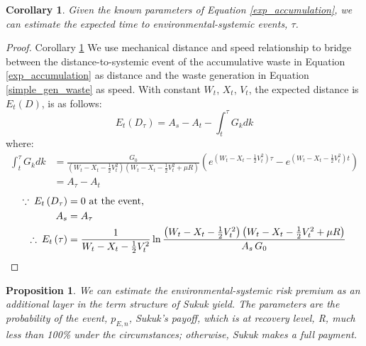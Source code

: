\documentclass[sn-basic]{sn-jnl}%
\theoremstyle{thmstyleone}%
\newtheorem{proposition}[theorem]{Proposition}
\newtheorem{corollary}[theorem]{Corollary}
\theoremstyle{thmstyletwo}%
\theoremstyle{thmstylethree}%
\begin{document}
\begin{corollary} \label{corollary_2}
	Given the known parameters of Equation \ref{exp_accumulation}, we can estimate the expected time to environmental-systemic events, $\tau$.
\end{corollary}

\begin{proof}{Corollary \ref{corollary_2}}
    We use mechanical distance and speed relationship to bridge between the distance-to-systemic event of the accumulative waste in Equation \ref{exp_accumulation} as distance and the waste generation in Equation \ref{simple_gen_waste} as speed. With constant $W_t$, $X_t$, $V_t$, the expected distance is $E_t\left(D\right)$, is as follows:
    \begin{equation}
        E_t\left(D_\tau\right)=A_s-A_t-\int_t^{\tau} G_k dk
    \end{equation}
    where: \footnotesize
    \begin{align*}
    \int_t^{\tau} G_k dk & =\frac{G_0}{\left(W_t-X_t-\frac{1}{2}V_t^2\right) \left(W_t-X_t-\frac{1}{2}V_t^2+\mu R\right)} \left(e^{\left(W_t-X_t-\frac{1}{2}V_t^2\right)\tau}-e^{\left(W_t-X_t-\frac{1}{2}V_t^2\right)t}\right) \\
    & = A_\tau-A_t
    \end{align*}
    \begin{align}
        \because \: E_t\left(D_\tau\right)&=0 \mbox{ at the event,}\notag\\
        A_s&=A_\tau\notag\\
        \therefore \: E_t\left(\tau\right)&=\frac{1}{W_t-X_t-\frac{1}{2}V_t^2} \ln{\frac{\left(W_t-X_t-\frac{1}{2}V_t^2\right) \left(W_t-X_t-\frac{1}{2}V_t^2+\mu R\right)}{A_s\, G_0}}
    \end{align} \normalsize
\end{proof}

\begin{proposition}\label{proposition_1}
	We can estimate the environmental-systemic risk premium as an additional layer in the term structure of Sukuk yield. The parameters are the probability of the event, $p_{E,n}$, Sukuk’s payoff, which is at recovery level, R, much less than 100\% under the circumstances; otherwise, Sukuk makes a full payment.
\end{proposition}
\end{document}
